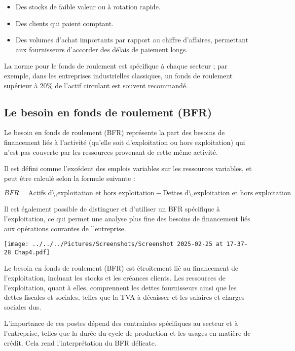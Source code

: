 \documentclass[a4paper, 12pt]{report}
\begin{document}
\begin{itemize}
	\item Des stocks de faible valeur ou à rotation rapide.
	\item Des clients qui paient comptant.
	\item Des volumes d'achat importants par rapport au chiffre d'affaires, permettant aux fournisseurs d'accorder des délais de paiement longs.
\end{itemize}

La norme pour le fonds de roulement est spécifique à chaque secteur ; par exemple, dans les entreprises industrielles classiques, un fonds de roulement supérieur à 20\% de l'actif circulant est souvent recommandé.

\subsection{Le besoin en fonds de roulement (BFR)}

Le besoin en fonds de roulement (BFR) représente la part des besoins de financement liés à l'activité (qu'elle soit d'exploitation ou hors exploitation) qui n'est pas couverte par les ressources provenant de cette même activité. 

Il est défini comme l'excédent des emplois variables sur les ressources variables, et peut être calculé selon la formule suivante :

\[
BFR = \text{Actifs d\'\,exploitation et hors exploitation} - \text{Dettes d\'\,exploitation et hors exploitation}
\]

Il est également possible de distinguer et d'utiliser un BFR spécifique à l'exploitation, ce qui permet une analyse plus fine des besoins de financement liés aux opérations courantes de l'entreprise.

\begin{center}
	\texttt{[image: ../../../Pictures/Screenshots/Screenshot 2025-02-25 at 17-37-28 Chap4.pdf]}
\end{center}

Le besoin en fonds de roulement (BFR) est étroitement lié au financement de l'exploitation, incluant les stocks et les créances clients. Les ressources de l'exploitation, quant à elles, comprennent les dettes fournisseurs ainsi que les dettes fiscales et sociales, telles que la TVA à décaisser et les salaires et charges sociales dus. 

L'importance de ces postes dépend des contraintes spécifiques au secteur et à l'entreprise, telles que la durée du cycle de production et les usages en matière de crédit. Cela rend l'interprétation du BFR délicate.
\end{document}

